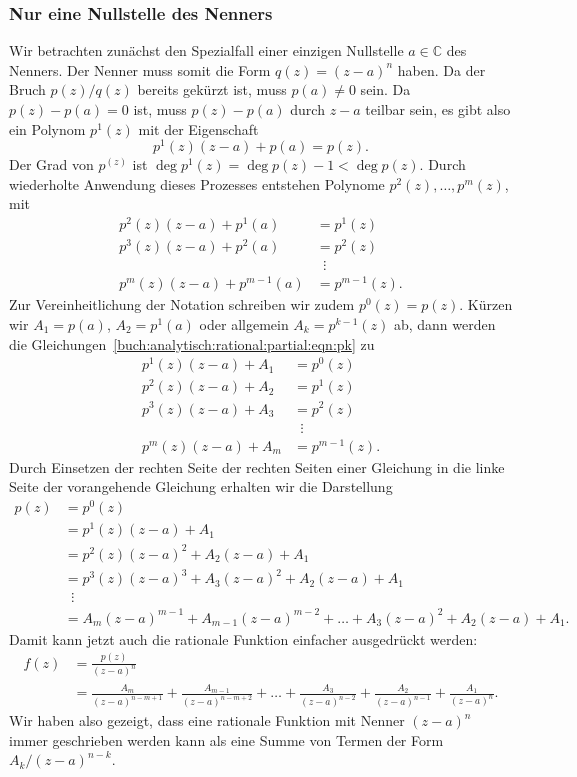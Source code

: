 \subsubsection{Nur eine Nullstelle des Nenners}
Wir betrachten zunächst den Spezialfall einer einzigen Nullstelle
$ a\in\mathbb{C}$ des Nenners.
%
Der Nenner muss somit die Form $q(z) = (z- a)^n$ haben.
Da der Bruch $p(z)/q(z)$ bereits gekürzt ist, muss $p( a)\ne 0$
sein.
Da $p(z)-p( a)=0$ ist, muss $p(z)-p( a)$ durch $z- a$
teilbar sein, es gibt also ein Polynom $p^1(z)$ mit der Eigenschaft
\[
p^1(z)(z- a) + p( a) = p(z).
\]
Der Grad von $p^(z)$ ist $\deg p^1(z) = \deg p(z)-1 < \deg p(z)$.
Durch wiederholte Anwendung dieses Prozesses entstehen Polynome
$p^2(z),\dots,p^m(z)$, mit 
\begin{equation}
\begin{aligned}
p^2(z)(z- a) + p^1( a)     &= p^1(z)           \\
p^3(z)(z- a) + p^2( a)     &= p^2(z)           \\[-2pt]
                                   &\phantom{a} \vdots \\
p^m(z)(z- a) + p^{m-1}( a) &= p^{m-1}(z).
\end{aligned}
\label{buch:analytisch:rational:partial:eqn:pk}
\end{equation}
Zur Vereinheitlichung der Notation schreiben wir zudem $p^0(z)=p(z)$.
Kürzen wir $A_1=p( a)$, $A_2=p^1( a)$ oder allgemein
$A_k = p^{k-1}(z)$ ab, dann werden die
Gleichungen~\eqref{buch:analytisch:rational:partial:eqn:pk}
zu
\[
\begin{aligned}
p^1(z)(z- a) + A_1 &= p^0(z)           \\
p^2(z)(z- a) + A_2 &= p^1(z)           \\
p^3(z)(z- a) + A_3 &= p^2(z)           \\[-2pt]
                       &\phantom{a} \vdots \\
p^m(z)(z- a) + A_m &= p^{m-1}(z).
\end{aligned}
\]
Durch Einsetzen der rechten Seite der rechten Seiten einer Gleichung
in die linke Seite der vorangehende Gleichung erhalten wir die
Darstellung
\begin{align*}
p(z)
&=
p^0(z)
\\
&=
p^1(z)(z- a) + A_1
\\
&=
p^2(z)(z- a)^2 + A_2(z- a) + A_1
\\
&=
p^3(z)(z- a)^3 + A_3 (z- a)^2 + A_2 (z- a) + A_1
\\[-2pt]
&\phantom{a}\vdots
\\
&=
A_m(z-a)^{m-1} + A_{m-1}(z- a)^{m-2} + \ldots + A_3 (z- a)^2 + A_2(z- a) + A_1.
\end{align*}
Damit kann jetzt auch die rationale Funktion einfacher ausgedrückt
werden:
\begin{align*}
f(z)
&=
\frac{p(z)}{(z- a)^n}
\\
&=
\frac{A_m}{(z- a)^{n-m+1}}
+
\frac{A_{m-1}}{(z- a)^{n-m+2}}
+
\ldots
+
\frac{A_3}{(z- a)^{n-2}}
+
\frac{A_2}{(z- a)^{n-1}}
+
\frac{A_1}{(z- a)^n}.
\end{align*}
Wir haben also gezeigt, dass eine rationale Funktion mit Nenner
$(z- a)^n$ immer geschrieben werden kann als eine Summe
von Termen der Form $A_k/(z- a)^{n-k}$.

